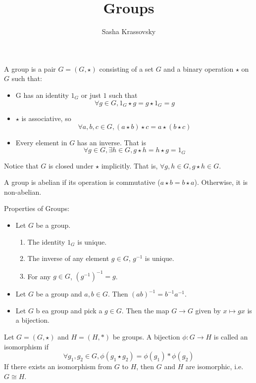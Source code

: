 \documentclass{article}
\title{Groups}
\author{Sasha Krassovsky}
\begin{document}
\maketitle

\begin{defn}
  A group is a pair $G = (G, \star)$ consisting of a set $G$
  and a binary operation $\star$ on $G$ such that:
  \begin{itemize}
  \item G has an identity $1_G$ or just $1$ such that
    $$\forall g \in G, 1_G \star g = g \star 1_G = g$$
  \item $\star$ is associative, so
    $$\forall a, b, c \in G, (a \star b) \star c = a \star (b \star c)$$
  \item Every element in $G$ has an inverse. That is
    $$\forall g \in G, \exists h \in G, g \star h = h \star g = 1_G$$    
  \end{itemize}
\end{defn}

\begin{remark}
  Notice that $G$ is closed under $\star$ implicitly. That is,
  $\forall g, h \in G, g \star h \in G$. 
\end{remark}

\begin{defn}
  A group is abelian if its operation is commutative ($a \star b = b \star a$).
  Otherwise, it is non-abelian. 
\end{defn}
\noindent Properties of Groups:
\begin{itemize}
\item Let $G$ be a group.
  \begin{enumerate}
  \item The identity $1_G$ is unique.
  \item The inverse of any element $g \in G$, $g^{-1}$ is unique.
  \item For any $g \in G$, $(g^{-1})^{-1} = g$.
  \end{enumerate}
\item Let $G$ be a group and $a, b \in G$. Then $(ab)^{-1} = b^{-1}a^{-1}$.
\item Let $G$ b ea group and pick a $g \in G$. Then the map $G \rightarrow G$ given
  by $x \mapsto gx$ is a bijection. 
\end{itemize}

\begin{defn}
  Let $G = (G, \star)$ and $H = (H, *)$ be groups. A bijection
  $\phi : G \rightarrow H$ is called an isomorphism if
  $$\forall g_1, g_2 \in G, \phi(g_1 \star g_2) = \phi(g_1) * \phi(g_2)$$
  If there exists an isomorphism from $G$ to $H$, then $G$ and $H$ are isomorphic,
  i.e. $G \cong H$. 
\end{defn}
\end{document}
